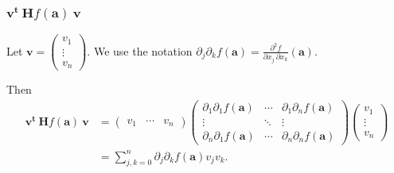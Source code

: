 \documentclass[aspectratio=169,handout]{beamer}
\newcommand{\bR}{\mathbb{R}} %
\renewcommand{\aa}{\mathbf{a}}
\newcommand{\vv}{\mathbf{v}}
\begin{document}
\begin{frame}
    \frametitle{\(\vv^{\mathbf{t}} \ \mathbf{H} f (\aa) \ \vv\)}

    Let \(\vv= \left( \begin{smallmatrix}
            v_1\\ \vdots \\v_n
        \end{smallmatrix} \right)  \).
    We use the notation
    \(\partial_{j}\partial_{k}f(\aa) = \frac{\partial^2 f}{\partial x_j\,\partial x_k} (\aa)\).

    Then
    \[
        \begin{aligned}
            \vv^{\mathbf{t}} \ \mathbf{H} f (\aa) \ \vv
             & =
            \begin{pmatrix}
                v_1 & \cdots & v_n
            \end{pmatrix}
            \begin{pmatrix}
                \partial_{1}\partial_{1}f(\aa) & \cdots &
                \partial_{1}\partial_{n}f(\aa)                   \\
                \vdots                         & \ddots & \vdots \\
                \partial_{n}\partial_{1}f(\aa) & \cdots &
                \partial_{n}\partial_{n}f(\aa)
            \end{pmatrix}
            \begin{pmatrix}
                v_1 \\ \vdots \\v_n
            \end{pmatrix} \\
             & = \sum_{j,k=0}^{n}
            \partial_{j}\partial_{k}f(\aa)
            v_j v_k.
        \end{aligned}
    \]


\end{frame}
\end{document}
